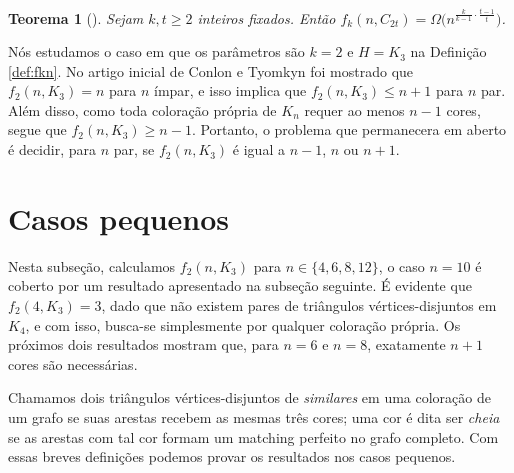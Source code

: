\documentclass[12pt,a4paper]{book}
\newtheorem{teorema}{Teorema}[chapter]
\begin{document}
    \begin{teorema}[\cite{janzer2023rainbow}]\label{teo:janzer-ciclos}
           Sejam $k,t \geq 2$ inteiros fixados. Então $f_k(n,C_{2t}) = \Omega\big(n^{\frac{k}{k-1} \cdot\frac{t-1}{t}}\big)$.
    \end{teorema}

Nós estudamos o caso em que os parâmetros são $k = 2$ e $H = K_3$ na Definição \ref{def:fkn}. 
No artigo inicial de Conlon e Tyomkyn foi mostrado que $f_2(n,K_3) = n$ para
$n$ ímpar, e isso implica que $f_2(n,K_3) \leq n + 1$ para $n$ par. 
Além disso, como toda coloração própria de $K_n$ requer ao menos $n-1$ cores, segue que $f_2(n,K_3) \geq n- 1$.
Portanto, o problema que permanecera em aberto é decidir, para $n$ par, se $f_2(n,K_3)$ é igual a $n-1$, $n$ ou $n + 1$.

\section{Casos pequenos}

Nesta subseção, calculamos $f_2(n,K_3)$ para $n \in \{4,6,8,12\}$, o caso $n=10$ é coberto por um resultado apresentado na subseção seguinte. 
É evidente que $f_2(4,K_3) = 3$, dado que não existem pares de triângulos vértices-disjuntos em $K_4$, e com isso, busca-se simplesmente por qualquer coloração própria. 
Os próximos dois resultados mostram que, para $n = 6$ e $n = 8$, exatamente $n + 1$ cores são necessárias.

Chamamos dois triângulos vértices-disjuntos de \textit{similares} em uma coloração de um grafo se suas arestas recebem as mesmas três cores;  uma cor é dita ser \textit{cheia} se as arestas com tal cor formam um matching perfeito no grafo completo. 
Com essas breves definições podemos provar os resultados nos casos pequenos.
\end{document}
